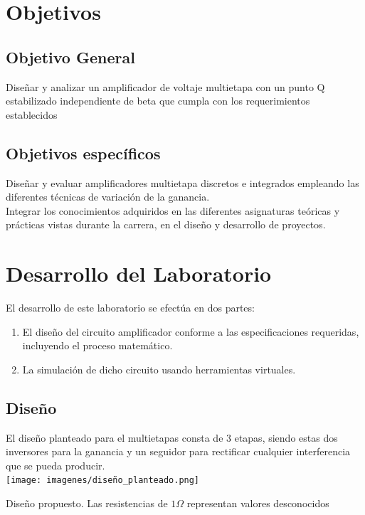 \documentclass[conference]{IEEEtran}
\begin{document}
\section{Objetivos}

\subsection{Objetivo General}

Diseñar y analizar un amplificador de voltaje multietapa con un punto Q estabilizado independiente de beta que cumpla con los requerimientos establecidos 

\subsection{Objetivos específicos}

Diseñar y evaluar amplificadores multietapa discretos e integrados empleando las diferentes técnicas de variación de la ganancia. \\

Integrar los conocimientos adquiridos en las diferentes asignaturas teóricas y prácticas vistas durante la carrera, en el diseño y desarrollo de proyectos.

\section{Desarrollo del Laboratorio}

El desarrollo de este laboratorio se efectúa en dos partes:\\
\begin{enumerate}
    \item El diseño del circuito amplificador conforme a las especificaciones requeridas, incluyendo el proceso matemático.
    \item La simulación de dicho circuito usando herramientas virtuales.
\end{enumerate}

\subsection{Diseño}
El diseño planteado para el multietapas consta de 3 etapas, siendo estas dos inversores para la ganancia y un seguidor para rectificar cualquier interferencia que se pueda producir.\\

\texttt{[image: imagenes/diseño\_planteado.png]}
\caption{Diseño propuesto. Las resistencias de $1\Omega$ representan valores desconocidos}
\end{document}
